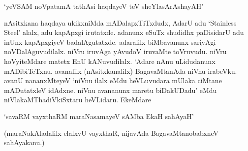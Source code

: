 \begin{shloka}
`yeVSAM noVpatamA tathAsi haqdayeV teV sheYlasArAshayAH'
\end{shloka}

nAsitxkana haqdaya ukikxniMda mADalapxTiTxdudx, AdarU adu `{\eng Stainless Steel}' alalx, adu kapApxgi irutatxde. adanunx eSuTx shudidhx paDisidarU adu inUnx kapApxgiyeV badalAgutatxde. adaralilx biMbavanunx sariyAgi noVDalAguvudilalx. niVru iruvAga yAvudoV iruvaMte toVruvudu. niVru hoVyiteMdare matetx EnU kANuvudilalx. `Adare nAnu uLidudanunx mADibiTeTxnu. avanalilx (nAsitxkanalilx) BagavaMtanAda niVnu irabeVku. avanU nananxMteyeV `niVnu ilalx eMdu heVLuvudara mUlaka ciMtane mADutatxleV idAdxne. niVnu avananunx maretu biDakUDadu' eMdu niVlakaMThadiVkiSxtaru heVLidaru. EkeMdare

\begin{shloka}
`savaRM vayxthaRM maraNasamayeV sAMba EkaH sahAyaH'
\end{shloka}

(maraNakAladalilx elalxvU vayxthaR, nijavAda BagavaMtanobabxneV sahAyakanu.)

